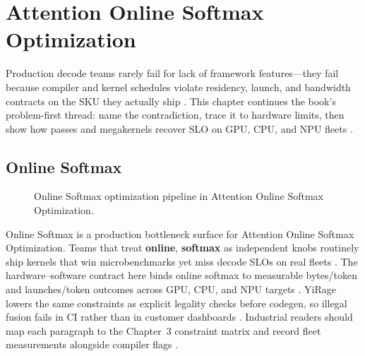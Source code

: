 \chapter{Attention Online Softmax Optimization}
\label{chap:ch10}

Production decode teams rarely fail for lack of framework features---they fail because compiler and kernel schedules violate residency, launch, and bandwidth contracts on the SKU they actually ship \citep{patel2025llminference,nvidia2022hopper}. This chapter continues the book's problem-first thread: name the contradiction, trace it to hardware limits, then show how passes and megakernels recover SLO on GPU, CPU, and NPU fleets \citep{taxbreak2026,semianalysis2024tma}.

\section{Online Softmax}
\label{sec:online_softmax}
\begin{figure}[t]
\centering
{}
\caption{Online Softmax optimization pipeline in Attention Online Softmax Optimization.}
\label{fig:online_softmax_pipeline}
\end{figure}


Online Softmax is a production bottleneck surface for Attention Online Softmax Optimization. Teams that treat \textbf{online}, \textbf{softmax} as independent knobs routinely ship kernels that win microbenchmarks yet miss decode SLOs on real fleets \citep{patel2025llminference,nvidia2022hopper}. The hardware--software contract here binds online softmax to measurable bytes/token and launches/token outcomes across GPU, CPU, and NPU targets \citep{taxbreak2026,semianalysis2024tma}. YiRage lowers the same constraints as explicit legality checks before codegen, so illegal fusion fails in CI rather than in customer dashboards \citep{memoryfloor2026,amd2024xdna}. Industrial readers should map each paragraph to the Chapter~3 constraint matrix and record fleet measurements alongside compiler flags \citep{nvidia2022hopper,amd2024aie}.

